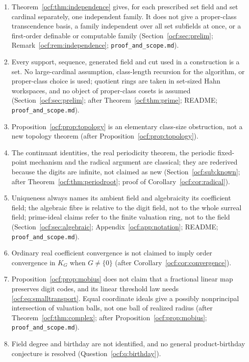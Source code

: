 \documentclass[11pt,a4paper]{article}
\numberwithin{equation}{section}
\theoremstyle{definition}
\theoremstyle{remark}
\newcommand{\rpath}[1]{\nolinkurl{#1}}%
\begin{document}
\begin{enumerate}[label=S\arabic*.,leftmargin=2.6em,itemsep=2pt]
\item Theorem~\ref{ocf:thm:independence} gives, for each prescribed set
field and set cardinal separately, one independent family. It does not give
a proper-class transcendence basis, a family independent over all set
subfields at once, or a first-order definable or computable family
(Section~\ref{ocf:sec:prelim}; Remark~\ref{ocf:rem:independence};
\rpath{proof\_and\_scope.md}).
\item Every support, sequence, generated field and cut used in a
construction is a set. No large-cardinal assumption, class-length
recursion for the algorithm, or proper-class choice is used; quotient rings
are taken in set-sized Hahn workspaces, and no object of proper-class
cosets is assumed (Section~\ref{ocf:sec:prelim}; after
Theorem~\ref{ocf:thm:prime}; README; \rpath{proof\_and\_scope.md}).
\item Proposition~\ref{ocf:prop:topology} is an elementary class-size
obstruction, not a new topology theorem (after
Proposition~\ref{ocf:prop:topology}).
\item The continuant identities, the real periodicity theorem, the periodic
fixed-point mechanism and the radical argument are classical; they are
rederived because the digits are infinite, not claimed as new
(Section~\ref{ocf:sub:known}; after Theorem~\ref{ocf:thm:periodroot};
proof of Corollary~\ref{ocf:cor:radical}).
\item Uniqueness always names its ambient field and algebraicity its
coefficient field; the algebraic fibre is relative to the digit field, not
to the whole surreal field; prime-ideal claims refer to the finite
valuation ring, not to the field (Section~\ref{ocf:sec:algebraic};
Appendix~\ref{ocf:app:notation}; README; \rpath{proof\_and\_scope.md}).
\item Ordinary real coefficient convergence is not claimed to imply order
convergence in $K_G$ when $G\ne\{0\}$ (after
Corollary~\ref{ocf:cor:convergence}).
\item Proposition~\ref{ocf:prop:mobius} does not claim that a fractional linear
map preserves digit codes, and its linear threshold law needs
\eqref{ocf:eq:smalltransport}. Equal coordinate ideals give a possibly
nonprincipal intersection of valuation balls, not one ball of realized
radius (after Theorem~\ref{ocf:thm:complex}; after
Proposition~\ref{ocf:prop:mobius}; \rpath{proof\_and\_scope.md}).
\item Field degree and birthday are not identified, and no general
product-birthday conjecture is resolved (Question~\ref{ocf:q:birthday}).

\end{enumerate}
\end{document}
